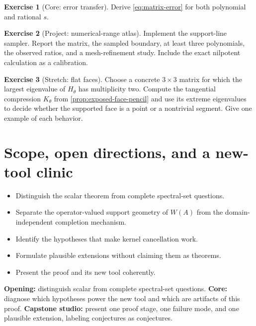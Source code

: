 \documentclass[11pt,oneside,openany]{book}
\theoremstyle{definition}
\newtheorem{exercise}{Exercise}[chapter]
\theoremstyle{remark}
\begin{document}
\begin{exercise}[Core: error transfer]
Derive \eqref{eq:matrix-error} for both polynomial and rational \(s\).
\end{exercise}

\begin{exercise}[Project: numerical-range atlas]
Implement the support-line sampler.  Report the matrix, the sampled
boundary, at least three polynomials, the observed ratios, and a
mesh-refinement study.  Include the exact nilpotent calculation as a
calibration.
\end{exercise}

\begin{exercise}[Stretch: flat faces]
Choose a concrete \(3\times3\) matrix for which the largest eigenvalue
of \(H_\theta\) has multiplicity two.  Compute the tangential
compression \(K_\theta\) from
\cref{prop:exposed-face-pencil} and use its extreme eigenvalues to
decide whether the supported face is a point or a nontrivial segment.
Give one example of each behavior.
\end{exercise}

\chapter{Scope, open directions, and a new-tool clinic}
\label{ch:scope}

\begin{learninggoals}
\begin{itemize}
  \item Distinguish the scalar theorem from complete spectral-set
  questions.
  \item Separate the operator-valued support geometry of \(W(A)\) from
  the domain-independent completion mechanism.
  \item Identify the hypotheses that make kernel cancellation work.
  \item Formulate plausible extensions without claiming them as
  theorems.
  \item Present the proof and its new tool coherently.
\end{itemize}
\end{learninggoals}

\begin{workshopplan}
\textbf{Opening:} distinguish scalar from complete spectral-set
questions. \textbf{Core:} diagnose which hypotheses power the new
tool and which are artifacts of this proof.
\textbf{Capstone studio:} present one proof stage, one failure mode,
and one plausible extension, labeling conjectures as conjectures.
\end{workshopplan}
\end{document}
